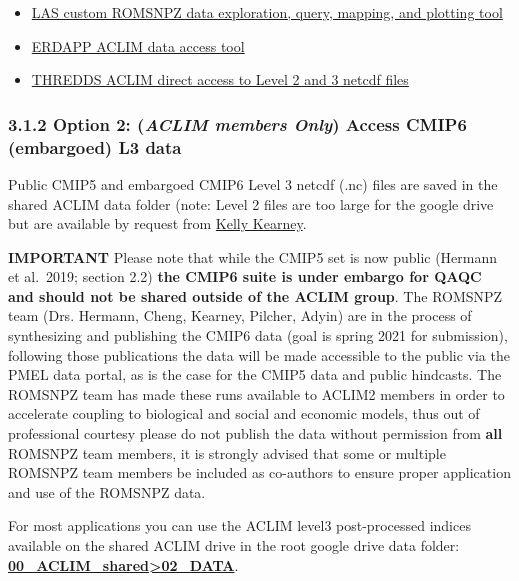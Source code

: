 \documentclass[
]{article}
\begin{document}
\begin{itemize}
\item
  \href{https://data.pmel.noaa.gov/aclim/las/}{LAS custom ROMSNPZ data
  exploration, query, mapping, and plotting tool}
\item
  \href{https://data.pmel.noaa.gov/aclim/erddap/}{ERDAPP ACLIM data
  access tool}
\item
  \href{https://data.pmel.noaa.gov/aclim/thredds/}{THREDDS ACLIM direct
  access to Level 2 and 3 netcdf files}
\end{itemize}

\hypertarget{option-2-aclim-members-only-access-cmip6-embargoed-l3-data}{%
\subsubsection{\texorpdfstring{3.1.2 Option 2: (\emph{ACLIM members
Only}) Access CMIP6 (embargoed) L3
data}{3.1.2 Option 2: (ACLIM members Only) Access CMIP6 (embargoed) L3 data}}\label{option-2-aclim-members-only-access-cmip6-embargoed-l3-data}}

Public CMIP5 and embargoed CMIP6 Level 3 netcdf (.nc) files are saved in
the shared ACLIM data folder (note: Level 2 files are too large for the
google drive but are available by request from
\href{kelly.kearney@noaa.gov}{Kelly Kearney}.

\textbf{IMPORTANT} Please note that while the CMIP5 set is now public
(Hermann et al.~2019; section 2.2) \textbf{the CMIP6 suite is under
embargo for QAQC and should not be shared outside of the ACLIM group}.
The ROMSNPZ team (Drs. Hermann, Cheng, Kearney, Pilcher, Adyin) are in
the process of synthesizing and publishing the CMIP6 data (goal is
spring 2021 for submission), following those publications the data will
be made accessible to the public via the PMEL data portal, as is the
case for the CMIP5 data and public hindcasts. The ROMSNPZ team has made
these runs available to ACLIM2 members in order to accelerate coupling
to biological and social and economic models, thus out of professional
courtesy please do not publish the data without permission from
\textbf{all} ROMSNPZ team members, it is strongly advised that some or
multiple ROMSNPZ team members be included as co-authors to ensure proper
application and use of the ROMSNPZ data.

For most applications you can use the ACLIM level3 post-processed
indices available on the shared ACLIM drive in the root google drive
data folder:
\href{https://drive.google.com/drive/u/0/folders/0Bx7wdZllbuF9eDJndkhCS2EwQUk}{\textbf{00\_ACLIM\_shared\textgreater02\_DATA}}.
\end{document}
